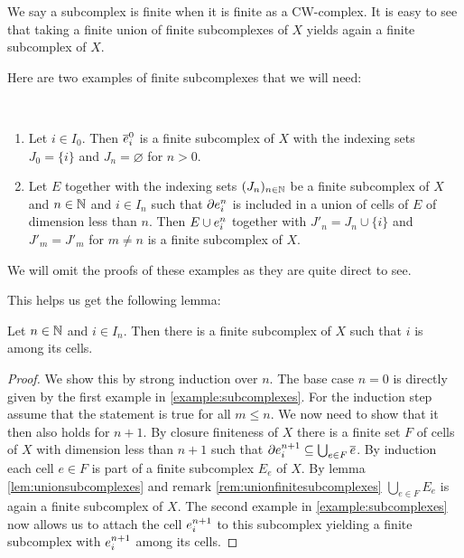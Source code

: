 \begin{rem} \label{rem:unionfinitesubcomplexes}
    We say a subcomplex is finite when it is finite as a CW-complex.
    It is easy to see that taking a finite union of finite subcomplexes of $X$ yields again a finite subcomplex of $X$.
\end{rem}

Here are two examples of finite subcomplexes that we will need:

\begin{example} \label{example:subcomplexes} ~
    \begin{enumerate}
        \item Let $i \in I_0$. Then $\closedCell{0}{i}$ is a finite subcomplex of $X$ with the indexing sets $J_0 = \{i\}$ and $J_n = \varnothing$ for $n > 0$.
        \item Let $E$ together with the indexing sets $(J_n)_{n \in \bN}$ be a finite subcomplex of $X$ and $n \in \bN$ and $i \in I_n$ such that $\cellFrontier{n}{i}$ is included in a union of cells of $E$ of dimension less than $n$. 
        Then $E \cup \openCell{n}{i}$ together with $J'_n = J_n \cup \{i\}$ and $J'_m = J'_m$ for $m \ne n$ is a finite subcomplex of $X$.
       \end{enumerate}
\end{example}

We will omit the proofs of these examples as they are quite direct to see. 

This helps us get the following lemma: 

\begin{lem} \label{lem:cellinfinitesubcomplex}
    Let $n \in \bN$ and $i \in I_n$. 
    Then there is a finite subcomplex of $X$ such that $i$ is among its cells. 
\end{lem}
\begin{proof}
    We show this by strong induction over $n$. 
    The base case $n = 0$ is directly given by the first example in \ref{example:subcomplexes}. 
    For the induction step assume that the statement is true for all $m \le n$.
    We now need to show that it then also holds for $n + 1$. 
    By closure finiteness of $X$ there is a finite set $F$ of cells of $X$ with dimension less than $n + 1$ such that $\cellFrontier{n  + 1}{i} \subseteq \bigcup_{e \in F} \closure{e}$. 
    By induction each cell $e \in F$ is part of a finite subcomplex $E_e$ of $X$. 
    By lemma \ref{lem:unionsubcomplexes} and remark \ref{rem:unionfinitesubcomplexes} $\bigcup_{e \in F}E_e$ is again a finite subcomplex of $X$. 
    The second example in \ref{example:subcomplexes} now allows us to attach the cell $\openCell{n + 1}{i}$ to this subcomplex yielding a finite subcomplex with $\openCell{n + 1}{i}$ among its cells.
\end{proof}


